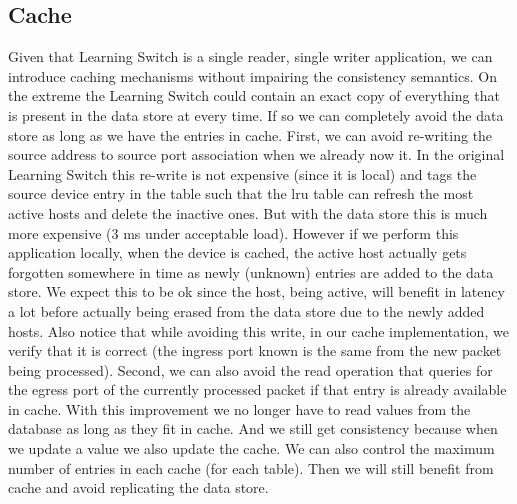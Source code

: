 \documentclass[12pt,openright,twoside]{report}
\begin{document}
\subsection{Cache}
\label{sec:ls:cache}
Given that Learning Switch is a single reader, single writer application, we can introduce caching mechanisms without impairing the consistency semantics. 
On the extreme the Learning Switch could contain an exact copy of everything that is present in the data store at every time. 
If so we can completely avoid the data store as long as we have the entries in cache.
First, we can avoid re-writing the source address to source port association when we already now it. 
In the original Learning Switch this re-write is not expensive (since it is local) and tags the source device  entry in the table such that the \gls{lru} table can refresh  the most  active hosts and delete the inactive ones.
But with the data store this is much more expensive (3 ms under acceptable load).
However if we perform this application locally, when the device is cached, the active host actually gets forgotten somewhere in time as newly (unknown) entries are added to the data store.  
We expect this to be ok since the host, being active, will benefit in latency a lot before actually being erased from the data store due to the newly added hosts. 
Also notice that while avoiding this write, in our cache implementation,  we verify that  it is correct (the ingress port known is the same from the new packet being processed).
Second, we can also avoid the read operation that queries for the egress port of the currently processed packet if that entry is already available in cache. 
With this improvement we no longer have to read values from the database as long as they fit in cache. And we still get consistency because when we update a value we also update the cache. 
We can also control the maximum number of entries in each cache (for each table). Then we will still benefit from cache and avoid replicating the data store.


\end{document}
